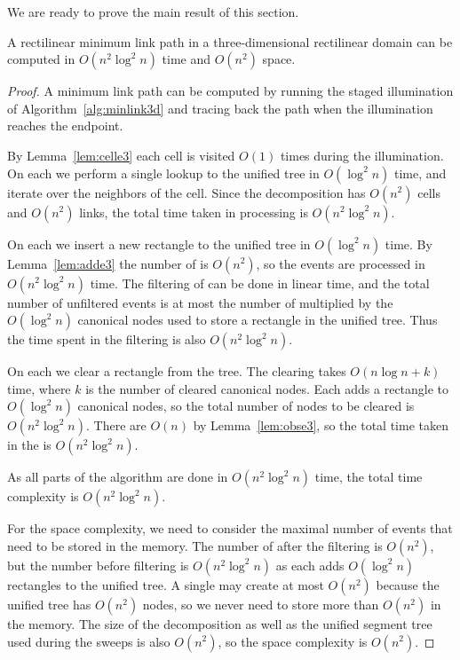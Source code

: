 \documentclass[english,gradu]{tktltiki2018}
\begin{document}
We are ready to prove the main result of this section.

\begin{theo}A rectilinear minimum link path in a three-dimensional rectilinear domain can be computed in $O(n^2\log^2n)$ time and $O(n^2)$ space.\end{theo}
\begin{proof}
A minimum link path can be computed by running the staged illumination of Algorithm~\ref{alg:minlink3d} and tracing back the path when the illumination reaches the endpoint.

By Lemma~\ref{lem:celle3} each cell is visited $O(1)$ times during the illumination.
On each \cellE we perform a single lookup to the unified tree in $O(\log^2 n)$ time, and iterate over the neighbors of the cell.
Since the decomposition has $O(n^2)$ cells and $O(n^2)$ links, the total time taken in processing \cellEs is $O(n^2\log^2 n)$.

On each \addE we insert a new rectangle to the unified tree in $O(\log^2 n)$ time.
By Lemma~\ref{lem:adde3} the number of \addEs is $O(n^2)$, so the events are processed in $O(n^2\log^2 n)$ time.
The filtering of \addEs can be done in linear time, and the total number of unfiltered events is at most the number of \addEs multiplied by the $O(\log^2 n)$ canonical nodes used to store a rectangle in the unified tree.
Thus the time spent in the filtering is also $O(n^2\log^2 n)$.

On each \obsE we clear a rectangle from the tree.
The clearing takes $O(n\log n + k)$ time, where $k$ is the number of cleared canonical nodes.
Each \addE adds a rectangle to $O(\log^2 n)$ canonical nodes, so the total number of nodes to be cleared is $O(n^2\log^2 n)$.
There are $O(n)$ \obsEs by Lemma~\ref{lem:obse3}, so the total time taken in the \obsEs is $O(n^2\log^2 n)$.

As all parts of the algorithm are done in $O(n^2\log^2 n)$ time, the total time complexity is $O(n^2\log^2 n)$.

For the space complexity, we need to consider the maximal number of events that need to be stored in the memory.
The number of \addEs after the filtering is $O(n^2)$, but the number before filtering is $O(n^2\log^2 n)$ as each \addE adds $O(\log^2 n)$ rectangles to the unified tree.
A single \obsE may create at most $O(n^2)$ \addEs because the unified tree has $O(n^2)$ nodes, so we never need to store more than $O(n^2)$ \addEs in the memory.
The size of the decomposition as well as the unified segment tree used during the sweeps is also $O(n^2)$, so the space complexity is $O(n^2)$.
\end{proof}
\end{document}
